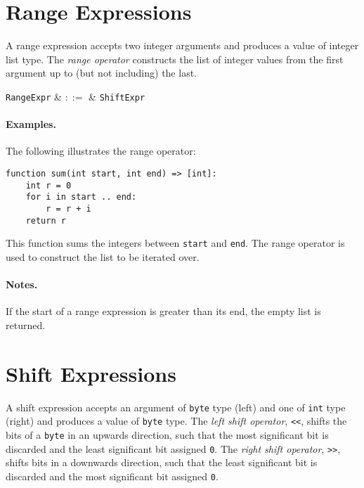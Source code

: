 \section{Range Expressions}
\label{c_expr_range}

A range expression accepts two integer arguments and produces a value of integer list type.  The {\em range operator} constructs the list of integer values from the first argument up to (but not including) the last.

\begin{syntax}
  \verb+RangeExpr+ & $::=$ & \verb+ShiftExpr+\ \\
\end{syntax}

\paragraph{Examples.}  The following illustrates the range operator:

\begin{lstlisting}
function sum(int start, int end) => [int]:
    int r = 0
    for i in start .. end:
        r = r + i
    return r
\end{lstlisting}

This function sums the integers between \lstinline{start} and \lstinline{end}.  The range operator is used to construct the list to be iterated over.

\paragraph{Notes.}  If the start of a range expression is greater than its end, the empty list is returned.


\section{Shift Expressions}
\label{c_expr_shift}

A shift expression accepts an argument of \lstinline{byte} type (left) and one of \lstinline{int} type (right) and produces a value of \lstinline{byte} type.  The {\em left shift operator}, \lstinline{<<}, shifts the bits of a \lstinline{byte} in an upwards direction, such that the most significant bit is discarded and the least significant bit assigned \lstinline{0}.  The {\em right shift operator}, \lstinline{>>}, shifts bits in a downwards direction, such that the least significant bit is discarded and the most significant bit assigned \lstinline{0}.  

